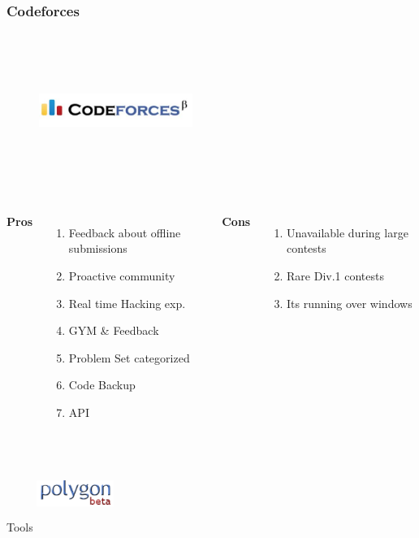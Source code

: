 \documentclass{beamer}
\begin{document}

\begin{frame}
	\frametitle{Codeforces}
	\begin{figure}[t]
		\href{http://codeforces.com/help}{\includegraphics[width=5cm,height=5cm,keepaspectratio]{images/judges/codeforces}}
	\end{figure}
	
	\begin{columns}[c] %
		\textbf{Pros}
		\begin{enumerate}
			\item Feedback about offline submissions 
			\item Proactive community 
			\item Real time Hacking exp.
			\item GYM \& Feedback
			\item Problem Set categorized
			\item Code Backup 
			\item API
		\end{enumerate}
		\textbf{Cons}
		\begin{enumerate}
			\item Unavailable during large contests
			\item Rare Div.1 contests
			\item Its running over windows
		\end{enumerate}
	\end{columns}
	\begin{block}{Tools}
	\center
	\href{https://polygon.codeforces.com/} {\includegraphics[width=2.5cm,height=2.5cm,keepaspectratio]{images/tools/polygon}}
	\end{block}

\end{frame}
\end{document}
